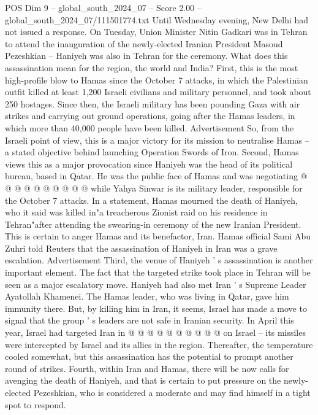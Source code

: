 \begin{textsample}{POS Dim 9 – global\_south\_2024\_07 – Score 2.00 – global\_south\_2024\_07/111501774.txt}  \label{ex:f9_pos_107}
Until Wednesday evening, New Delhi had not issued a response.
On Tuesday, Union Minister Nitin Gadkari was in Tehran to attend the inauguration of the newly-elected Iranian President Masoud Pezeshkian -- Haniyeh was also in Tehran for the ceremony.
What does this assassination mean for the region, the world and India?
First, this is the most high-profile blow to Hamas since the October 7 attacks, in which the Palestinian outfit killed at least 1,200 Israeli civilians and military personnel, and took about 250 hostages.
Since then, the Israeli military has been pounding Gaza with air strikes and carrying out ground operations, going after the Hamas leaders, in which more than 40,000 people have been killed.
Advertisement So, from the Israeli point of view, this is a major victory for its mission to neutralise Hamas -- a stated objective behind launching Operation Swords of Iron.
Second, Hamas views this as a major provocation since Haniyeh was the head of its political bureau, based in Qatar.
He was the public face of Hamas and was negotiating @ @ @ @ @ @ @ @ @ @ while Yahya Sinwar is its military leader, responsible for the October 7 attacks.
In a statement, Hamas mourned the death of Haniyeh, who it said was killed in"a treacherous Zionist raid on his residence in Tehran"after attending the swearing-in ceremony of the new Iranian President.
This is certain to anger Hamas and its benefactor, Iran.
Hamas official Sami Abu Zuhri told Reuters that the assassination of Haniyeh in Iran was a grave escalation.
Advertisement Third, the venue of Haniyeh ' s assassination is another important element.
The fact that the targeted strike took place in Tehran will be seen as a major escalatory move.
Haniyeh had also met Iran ' s Supreme Leader Ayatollah Khamenei.
The Hamas leader, who was living in Qatar, gave him immunity there.
But, by killing him in Iran, it seems, Israel has made a move to signal that the group ' s leaders are not safe in Iranian security.
In April this year, Israel had targeted Iran in @ @ @ @ @ @ @ @ @ @ on Israel -- its missiles were intercepted by Israel and its allies in the region.
Thereafter, the temperature cooled somewhat, but this assassination has the potential to prompt another round of strikes.
Fourth, within Iran and Hamas, there will be now calls for avenging the death of Haniyeh, and that is certain to put pressure on the newly-elected Pezeshkian, who is considered a moderate and may find himself in a tight spot to respond.

\end{textsample}

